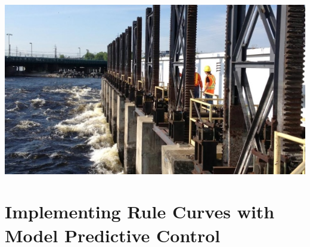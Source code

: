 \documentclass[compress,english]{beamer}
\begin{document}

{\usebackgroundtemplate%
	{\includegraphics[height=\paperheight]{fort-frances-dam.jpg}}
\section{Implementing Rule Curves with Model Predictive Control}
}
\end{document}
